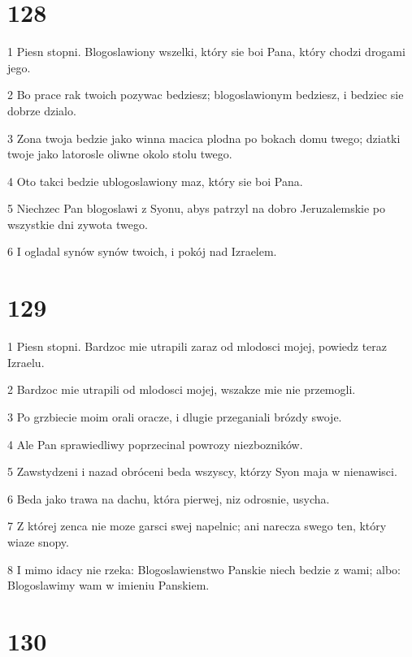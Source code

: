 \chapter{128}

\par 1 Piesn stopni. Blogoslawiony wszelki, który sie boi Pana, który chodzi drogami jego.
\par 2 Bo prace rak twoich pozywac bedziesz; blogoslawionym bedziesz, i bedziec sie dobrze dzialo.
\par 3 Zona twoja bedzie jako winna macica plodna po bokach domu twego; dziatki twoje jako latorosle oliwne okolo stolu twego.
\par 4 Oto takci bedzie ublogoslawiony maz, który sie boi Pana.
\par 5 Niechzec Pan blogoslawi z Syonu, abys patrzyl na dobro Jeruzalemskie po wszystkie dni zywota twego.
\par 6 I ogladal synów synów twoich, i pokój nad Izraelem.

\chapter{129}

\par 1 Piesn stopni. Bardzoc mie utrapili zaraz od mlodosci mojej, powiedz teraz Izraelu.
\par 2 Bardzoc mie utrapili od mlodosci mojej, wszakze mie nie przemogli.
\par 3 Po grzbiecie moim orali oracze, i dlugie przeganiali brózdy swoje.
\par 4 Ale Pan sprawiedliwy poprzecinal powrozy niezbozników.
\par 5 Zawstydzeni i nazad obróceni beda wszyscy, którzy Syon maja w nienawisci.
\par 6 Beda jako trawa na dachu, która pierwej, niz odrosnie, usycha.
\par 7 Z której zenca nie moze garsci swej napelnic; ani narecza swego ten, który wiaze snopy.
\par 8 I mimo idacy nie rzeka: Blogoslawienstwo Panskie niech bedzie z wami; albo: Blogoslawimy wam w imieniu Panskiem.

\chapter{130}

